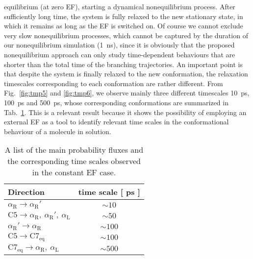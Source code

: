 \documentclass[journal=jctcce,manuscript=manuscript]{achemso}
\newcommand{\confaa}[0]{{\alpha_{\textrm{R}}}}
\newcommand{\confab}[0]{{\alpha_{\textrm{R}}'}}
\newcommand{\confba}[0]{{\textrm{C}7_{\textrm{eq}}}}
\newcommand{\confbb}[0]{{\textrm{C}5}}
\newcommand{\confc}[0]{{\alpha_{\textrm{L}}}}
\begin{document}
equilibrium (at zero EF),  starting a dynamical nonequilibrium process.
After sufficiently long time, the system
is fully relaxed to the new stationary state, in
which it remains as long as the EF is switched on.
Of course we cannot exclude very slow nonequilibrium processes,
which cannot be captured by the duration of
our nonequilibrium simulation (1~ns), since it is
obviously that the proposed nonequilibrium approach
can only study time-dependent behaviours that are shorter than
the total time of the branching trajectories. 
An important point is that despite the system is finally relaxed to the new conformation,
the relaxation timescales corresponding to each conformation are rather different. 
From Fig.~\ref{fig:tmp5} and \ref{fig:tmp6}, we observe mainly
three different timescales 10~ps, 100~ps and 500~ps,
whose corresponding conformations are summarized in Tab.~\ref{tab:tmp1}.
This is a relevant result because it shows the possibility of employing an external EF as a tool to identify relevant time scales in the conformational behaviour of a molecule in solution.

\begin{table}
  \centering
  \begin{tabular*}{0.4\textwidth}{@{\extracolsep{\fill}}lc}\hline\hline
    Direction        & time scale [ ps ] \\\hline
    $\confaa\rightarrow \confab$        &       $\sim 10$      \\
    $\confbb\rightarrow \confaa,\ \confab,\ \confc$        &       $\sim 50$      \\    
    $\confab\rightarrow \confaa$        &       $\sim 100$      \\
    $\confbb\rightarrow \confba$        &       $\sim 100$      \\    
    $\confba\rightarrow \confaa,\ \confc$        &       $\sim 500$      \\    \hline\hline
  \end{tabular*}
  \caption{A list of the main probability fluxes and the corresponding time scales observed in the constant EF case.}
  \label{tab:tmp1}
\end{table}
\end{document}
